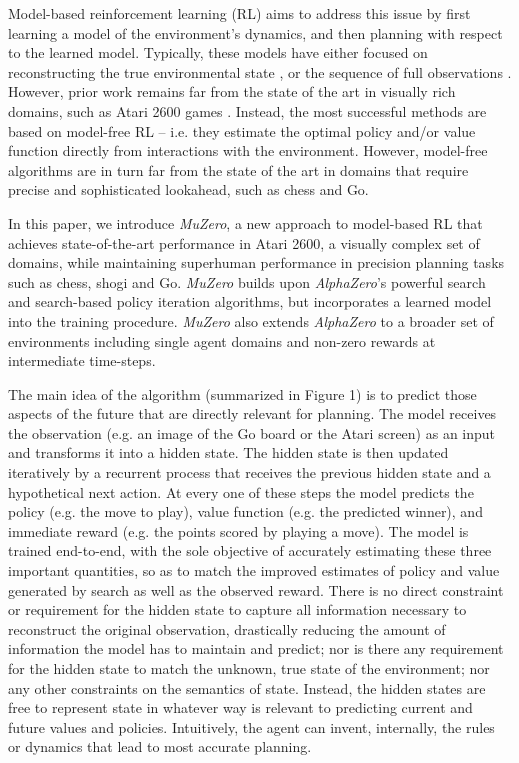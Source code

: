 \documentclass{article}
\newcommand{\muzero}{\emph{MuZero}}
\newcommand{\alphazero}{\emph{AlphaZero}}
\begin{document}
Model-based reinforcement learning (RL) \cite{sutton:book} aims to address this issue by first learning a model of the environment's dynamics, and then planning with respect to the learned model. Typically, these models have either focused on reconstructing the true environmental state \cite{pilco:deisenroth,heess:stochastic_value_gradients,levine:learning_guided_policy}, or the sequence of full observations \cite{hafner:planet, kaiser:simple}. However, prior work \cite{state_space_models, hafner:planet, kaiser:simple} remains far from the state of the art in visually rich domains, such as Atari 2600 games \cite{ALE}.
Instead, the most successful methods are based on model-free RL \cite{impala, r2d2, apex} -- i.e. they estimate the optimal policy and/or value function directly from interactions with the environment. However, model-free algorithms are in turn far from the state of the art in domains that require precise and sophisticated lookahead, such as chess and Go.

In this paper, we introduce \muzero{}, a new approach to model-based RL that achieves state-of-the-art performance in Atari 2600, a visually complex set of domains, while maintaining superhuman performance in precision planning tasks such as chess, shogi and Go.
\muzero{} builds upon \alphazero{}'s \cite{Silver18AZ} powerful search and search-based policy iteration algorithms, but incorporates a learned model into the training procedure. \muzero{} also extends \alphazero{} to a broader set of environments including single agent domains and non-zero rewards at intermediate time-steps.
%

The main idea of the algorithm (summarized in Figure 1) is to predict those aspects of the future that are directly relevant for planning. The model receives the observation (e.g. an image of the Go board or the Atari screen) as an input and transforms it into a hidden state. The hidden state is then updated iteratively by a recurrent process that receives the previous hidden state and a hypothetical next action. At every one of these steps the model predicts the policy (e.g. the move to play), value function (e.g. the predicted winner), and immediate reward (e.g. the points scored by playing a move). The model is trained end-to-end, with the sole objective of accurately estimating these three important quantities, so as to match the improved estimates of policy and value generated by search as well as the observed reward. There is no direct constraint or requirement for the hidden state to capture all information necessary to reconstruct the original observation, drastically reducing the amount of information the model has to maintain and predict; nor is there any requirement for the hidden state to match the unknown, true state of the environment; nor any other constraints on the semantics of state. Instead, the hidden states are free to represent state in whatever way is relevant to predicting current and future values and policies. Intuitively, the agent can invent, internally, the rules or dynamics that lead to most accurate planning.
\end{document}
